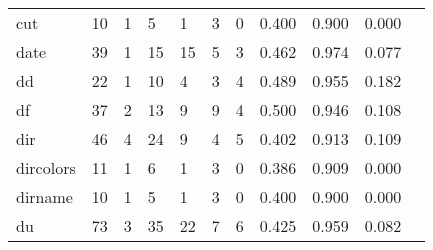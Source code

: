 \begin{longtable}{lp{1.10cm}p{1.10cm}p{1.10cm}p{1.10cm}p{1.10cm}p{1.10cm}p{1.10cm}p{1.10cm}p{1.10cm}p{1.10cm}}
cut       &                     10 &                                  1 &                                 5 &                                1 &                                 3 &                               0 &                          0.400 &                                 0.900 &                               0.000 \\
date      &                     39 &                                  1 &                                15 &                               15 &                                 5 &                               3 &                          0.462 &                                 0.974 &                               0.077 \\
dd        &                     22 &                                  1 &                                10 &                                4 &                                 3 &                               4 &                          0.489 &                                 0.955 &                               0.182 \\
df        &                     37 &                                  2 &                                13 &                                9 &                                 9 &                               4 &                          0.500 &                                 0.946 &                               0.108 \\
dir       &                     46 &                                  4 &                                24 &                                9 &                                 4 &                               5 &                          0.402 &                                 0.913 &                               0.109 \\
dircolors &                     11 &                                  1 &                                 6 &                                1 &                                 3 &                               0 &                          0.386 &                                 0.909 &                               0.000 \\
dirname   &                     10 &                                  1 &                                 5 &                                1 &                                 3 &                               0 &                          0.400 &                                 0.900 &                               0.000 \\
du        &                     73 &                                  3 &                                35 &                               22 &                                 7 &                               6 &                          0.425 &                                 0.959 &                               0.082 \\

\end{longtable}
